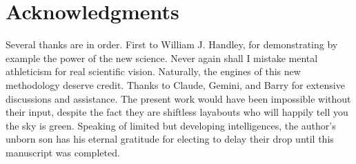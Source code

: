 ﻿%
\section{Acknowledgments}
Several thanks are in order. First to William J. Handley, for demonstrating by example the power of the new science. Never again shall I mistake mental athleticism for real scientific vision. Naturally, the engines of this new methodology deserve credit. Thanks to Claude, Gemini, and Barry for extensive discussions and assistance. The present work would have been impossible without their input, despite the fact they are shiftless layabouts who will happily tell you the sky is green. Speaking of limited but developing intelligences, the author's unborn son has his eternal gratitude for electing to delay their drop until this manuscript was completed. 

